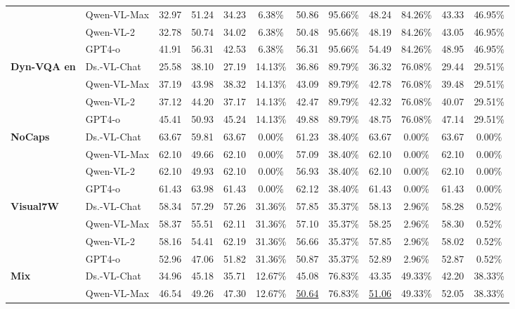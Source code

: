 \begin{table*}[t]
{\begin{tabular}{llcccccccc|cc}
     & Qwen-VL-Max & 32.97 & 51.24 & 34.23 & 6.38\% & 50.86 & 95.66\% & 48.24 & 84.26\% & 43.33 & 46.95\% \\
     & Qwen-VL-2 & 32.78 & 50.74 & 34.02 & 6.38\% & 50.48 & 95.66\% & 48.19 & 84.26\% & 43.05 & 46.95\% \\
     & GPT4-o & 41.91 & 56.31 & 42.53 & 6.38\% & 56.31 & 95.66\% & 54.49 & 84.26\% & 48.95 & 46.95\% \\ 
    \midrule
    \multirow{4}{*}{\textbf{Dyn-VQA en}} & Ds.-VL-Chat & 25.58 & 38.10 & 27.19 & 14.13\% & 36.86 & 89.79\% & 36.32 & 76.08\% & 29.44 & 29.51\% \\
     & Qwen-VL-Max & 37.19 & 43.98 & 38.32 & 14.13\% & 43.09 & 89.79\% & 42.78 & 76.08\% & 39.48 & 29.51\% \\
     & Qwen-VL-2 & 37.12 & 44.20 & 37.17 & 14.13\% & 42.47 & 89.79\% & 42.32 & 76.08\% & 40.07 & 29.51\% \\
     & GPT4-o & 45.41 & 50.93 & 45.24 & 14.13\% & 49.88 & 89.79\% & 48.75 & 76.08\% & 47.14 & 29.51\% \\ 
    \midrule
    \multirow{4}{*}{\textbf{NoCaps}} & Ds.-VL-Chat & 63.67 & 59.81 & 63.67 & 0.00\% & 61.23 & 38.40\% & 63.67 & 0.00\% & 63.67 & 0.00\% \\
     & Qwen-VL-Max & 62.10 & 49.66 & 62.10 & 0.00\% & 57.09 & 38.40\% & 62.10 & 0.00\% & 62.10 & 0.00\% \\
     & Qwen-VL-2 & 62.10 & 49.93 & 62.10 & 0.00\% & 56.93 & 38.40\% & 62.10 & 0.00\% & 62.10 & 0.00\% \\
     & GPT4-o & 61.43 & 63.98 & 61.43 & 0.00\% & 62.12 & 38.40\% & 61.43 & 0.00\% & 61.43 & 0.00\% \\ 
    \midrule
    \multirow{4}{*}{\textbf{Visual7W}} & Ds.-VL-Chat & 58.34 & 57.29 & 57.26 & 31.36\% & 57.85 & 35.37\% & 58.13 & 2.96\% & 58.28 & 0.52\% \\
     & Qwen-VL-Max & 58.37 & 55.51 & 62.11 & 31.36\% & 57.10 & 35.37\% & 58.25 & 2.96\% & 58.30 & 0.52\% \\
     & Qwen-VL-2 & 58.16 & 54.41 & 62.19 & 31.36\% & 56.66 & 35.37\% & 57.85 & 2.96\% & 58.02 & 0.52\% \\
     & GPT4-o & 52.96 & 47.06 & 51.82 & 31.36\% & 50.87 & 35.37\% & 52.89 & 2.96\% & 52.87 & 0.52\% \\ 
    \midrule
    \midrule
    \multirow{4}{*}{\textbf{Mix}} & Ds.-VL-Chat & 34.96 & 45.18 & 35.71 & 12.67\% & 45.08 & 76.83\% & 43.35 & 49.33\% & 42.20 & 38.33\% \\
     & Qwen-VL-Max & 46.54 & 49.26 & 47.30 & 12.67\% & \uline{50.64} & 76.83\% & \uline{51.06} & 49.33\% & 52.05 & 38.33\% \\

\end{tabular}}
\end{table*}

